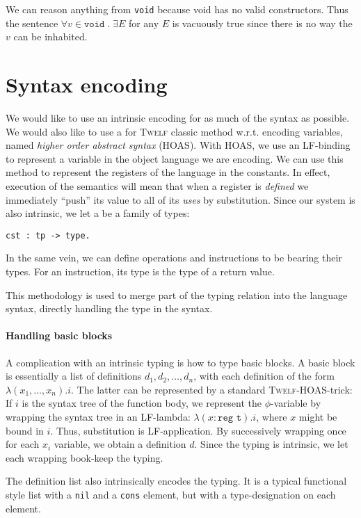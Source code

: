 \documentclass[a4paper, oneside, 10pt, draft]{memoir}
\newcommand{\twelf}{\textsc{Twelf}}
\begin{document}
We can reason anything from \texttt{void} because void has no valid
constructors. Thus the sentence $\forall v \in \texttt{void} \; . \; \exists
E$ for any $E$ is vacuously true since there is no way the $v$ can be
inhabited.

\section{Syntax encoding}

We would like to use an intrinsic encoding for as much of the syntax
as possible. We would also like to use a for \twelf{} classic method
w.r.t. encoding variables, named \emph{higher order abstract syntax}
(HOAS). With HOAS, we use an LF-binding to represent a variable in the
object language we are encoding. We can use this method to represent
the registers of the language in the constants. In effect, execution
of the semantics will mean that when a register is \emph{defined} we
immediately ``push'' its value to all of its \emph{uses} by
substitution. Since our system is also intrinsic, we let a be a family
of types:
\begin{verbatim}
cst : tp -> type.
\end{verbatim}
In the same vein, we can define operations and instructions to be
bearing their types. For an instruction, its type is the type of a
return value.

This methodology is used to merge part of the typing relation into the
language syntax, directly handling the type in the syntax.

\paragraph{Handling basic blocks}

A complication with an intrinsic typing is how to type basic blocks. A
basic block is essentially a list of definitions $d_1, d_2, \dotsc,
d_n$, with each definition of the form $\lambda (x_1, \dotsc,
x_n).i$. The latter can be represented by a standard \twelf{}-HOAS-trick:
If $i$ is the syntax tree of the function body, we represent the
$\phi$-variable by wrapping the syntax tree in an LF-lambda: $\lambda
(x : \texttt{reg t}) . i$, where $x$ might be bound in $i$. Thus,
substitution is LF-application. By successively wrapping once for each
$x_i$ variable, we obtain a definition $d$. Since the typing is
intrinsic, we let each wrapping book-keep the typing.

The definition list also intrinsically encodes the typing. It is a
typical functional style list with a \texttt{nil} and a \texttt{cons}
element, but with a type-designation on each element.
\end{document}
